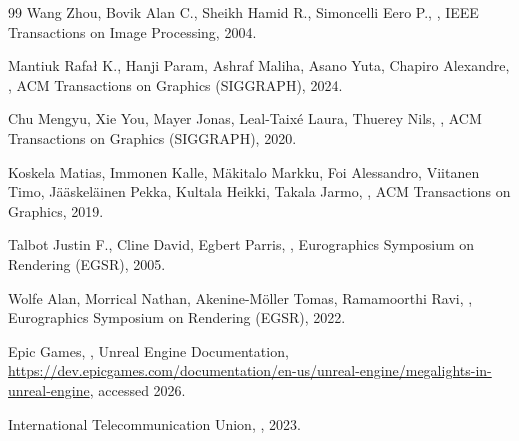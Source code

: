 \begin{thebibliography}{99}
Wang Zhou, Bovik Alan C., Sheikh Hamid R., Simoncelli Eero P., , IEEE Transactions on Image Processing, 2004.

Mantiuk Rafa\l{} K., Hanji Param, Ashraf Maliha, Asano Yuta, Chapiro Alexandre,
, ACM
Transactions on Graphics (SIGGRAPH), 2024.

Chu Mengyu, Xie You, Mayer Jonas, Leal-Taix\'e Laura, Thuerey Nils, , ACM Transactions on Graphics (SIGGRAPH), 2020.

Koskela Matias, Immonen Kalle, M\"akitalo Markku, Foi Alessandro, Viitanen Timo, J\"a\"askel\"ainen
Pekka, Kultala Heikki, Takala Jarmo, , ACM Transactions on Graphics, 2019.

Talbot Justin F., Cline David, Egbert Parris, ,
Eurographics Symposium on Rendering (EGSR), 2005.

Wolfe Alan, Morrical Nathan, Akenine-M\"oller Tomas, Ramamoorthi Ravi, , Eurographics Symposium on Rendering (EGSR), 2022.

Epic Games, , Unreal Engine Documentation,
\url{https://dev.epicgames.com/documentation/en-us/unreal-engine/megalights-in-unreal-engine},
accessed 2026.

International Telecommunication Union, , 2023.

\end{thebibliography}
